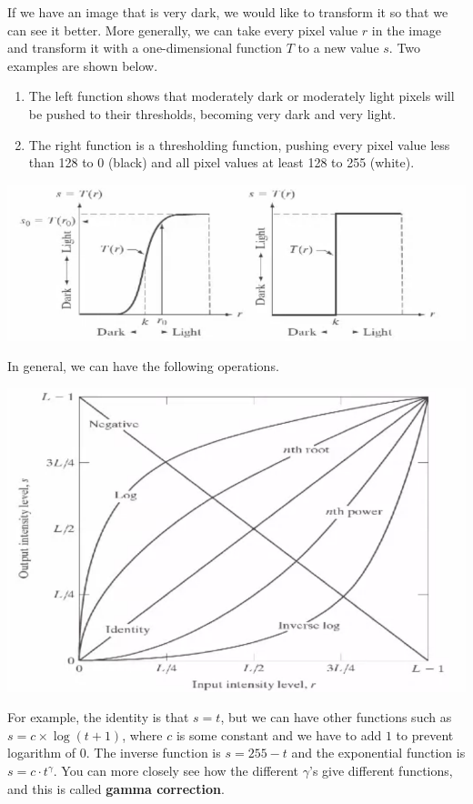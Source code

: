 \documentclass{article}
\begin{document}
    If we have an image that is very dark, we would like to transform it so that we can see it better. More generally, we can take every pixel value $r$ in the image and transform it with a one-dimensional function $T$ to a new value $s$. Two examples are shown below. 
    \begin{enumerate}
        \item The left function shows that moderately dark or moderately light pixels will be pushed to their thresholds, becoming very dark and very light. 
        \item The right function is a thresholding function, pushing every pixel value less than 128 to 0 (black) and all pixel values at least 128 to 255 (white). 
    \end{enumerate}
    \begin{center}
        \includegraphics[scale=0.4]{img/point_function.png}
    \end{center}
    In general, we can have the following operations. 
    \begin{center}
        \includegraphics[scale=0.4]{img/point_functions.png}
    \end{center}
    For example, the identity is that $s = t$, but we can have other functions such as $s = c \times \log(t + 1)$, where $c$ is some constant and we have to add $1$ to prevent logarithm of $0$. The inverse function is $s = 255 - t$ and the exponential function is $s = c \cdot t^\gamma$. You can more closely see how the different $\gamma$'s give different functions, and this is called \textbf{gamma correction}. 
\end{document}
